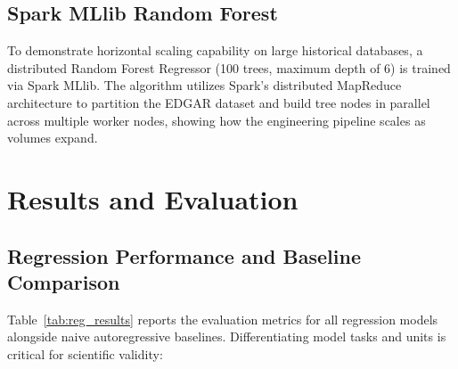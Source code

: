 \documentclass[conference]{IEEEtran}
\begin{document}
\subsection{Spark MLlib Random Forest}
To demonstrate horizontal scaling capability on large historical databases, a distributed Random Forest Regressor (100 trees, maximum depth of 6) is trained via Spark MLlib. The algorithm utilizes Spark's distributed MapReduce architecture to partition the EDGAR dataset and build tree nodes in parallel across multiple worker nodes, showing how the engineering pipeline scales as volumes expand.

\section{Results and Evaluation}

\subsection{Regression Performance and Baseline Comparison}
Table~\ref{tab:reg_results} reports the evaluation metrics for all regression models alongside naive autoregressive baselines. Differentiating model tasks and units is critical for scientific validity:

\begin{table}[h]
\caption{Regression Performance and Baseline Comparison}
\label{tab:reg_results}
\centering
\scriptsize
{}
\end{table}
\end{document}
